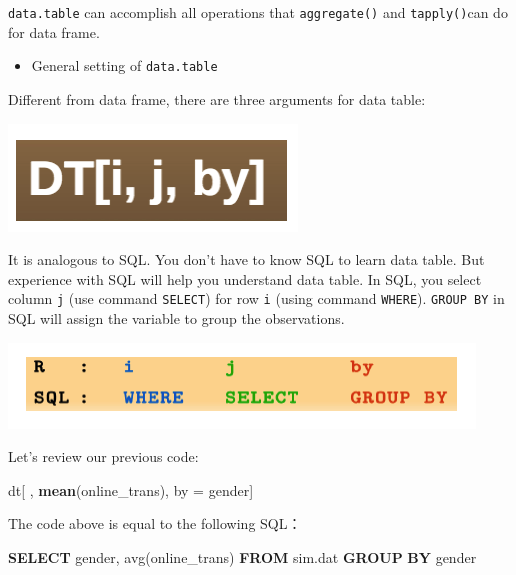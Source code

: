 \documentclass[12pt,]{krantz}
\makeatletter
\newenvironment{Shaded}{\begin{snugshade}}{\end{snugshade}}
\newcommand{\KeywordTok}[1]{\textcolor[rgb]{0.27,0.27,0.27}{\textbf{#1}}}
\newcommand{\StringTok}[1]{\textcolor[rgb]{0.5,0.5,0.5}{#1}}
\newcommand{\FunctionTok}[1]{\textcolor[rgb]{0,0,0}{#1}}
\newcommand{\NormalTok}[1]{#1}
\providecommand{\tightlist}{%
  \setlength{\itemsep}{0pt}\setlength{\parskip}{0pt}}
\newenvironment{kframe}{%
\medskip{}
\setlength{\fboxsep}{.8em}
 \def\at@end@of@kframe{}%
 \ifinner\ifhmode%
  \def\at@end@of@kframe{\end{minipage}}%
  \begin{minipage}{\columnwidth}%
 \fi\fi%
 \def\FrameCommand##1{\hskip\@totalleftmargin \hskip-\fboxsep
 \colorbox{shadecolor}{##1}\hskip-\fboxsep
     \hskip-\linewidth \hskip-\@totalleftmargin \hskip\columnwidth}%
 \MakeFramed {\advance\hsize-\width
   \@totalleftmargin\z@ \linewidth\hsize
   \@setminipage}}%
 {\par\unskip\endMakeFramed%
 \at@end@of@kframe}
\renewenvironment{Shaded}{\begin{kframe}}{\end{kframe}}
\theoremstyle{definition}
\theoremstyle{definition}
\theoremstyle{definition}
\theoremstyle{remark}
\makeatother
\begin{document}
\texttt{data.table} can accomplish all operations that
\texttt{aggregate()} and \texttt{tapply()}can do for data frame.

\begin{itemize}
\tightlist
\item
  General setting of \texttt{data.table}
\end{itemize}

Different from data frame, there are three arguments for data table:

\includegraphics{images/datable1.png}

It is analogous to SQL. You don't have to know SQL to learn data table.
But experience with SQL will help you understand data table. In SQL, you
select column \texttt{j} (use command \texttt{SELECT}) for row
\texttt{i} (using command \texttt{WHERE}). \texttt{GROUP\ BY} in SQL
will assign the variable to group the observations.

\includegraphics{images/rSQL.png}

Let's review our previous code:

\begin{Shaded}
\begin{Highlighting}[]
\NormalTok{dt[ , }\KeywordTok{mean}\NormalTok{(online_trans), by =}\StringTok{ }\NormalTok{gender]}
\end{Highlighting}
\end{Shaded}

The code above is equal to the following SQL：

\begin{Shaded}
\begin{Highlighting}[]
\KeywordTok{SELECT}\NormalTok{  gender, }\FunctionTok{avg}\NormalTok{(online_trans) }\KeywordTok{FROM}\NormalTok{ sim.dat }\KeywordTok{GROUP} \KeywordTok{BY}\NormalTok{ gender}
\end{Highlighting}
\end{Shaded}
\end{document}
